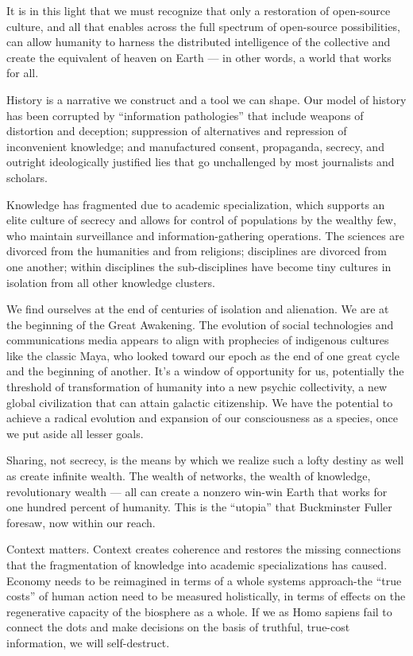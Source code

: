 \documentclass[letterpaper,12pt,english]{sphinxmanual}
\begin{document}
It is in this light that we must recognize that only a restoration of open-source culture, and all that enables across the full spectrum of open-source possibilities, can allow humanity to harness the distributed intelligence of the collective and create the equivalent of heaven on Earth — in other words, a world that works for all.

History is a narrative we construct and a tool we can shape. Our model of history has been corrupted by ``information pathologies'' that include weapons of distortion and deception; suppression of alternatives and repression of inconvenient knowledge; and manufactured consent, propaganda, secrecy, and outright ideologically justified lies that go unchallenged by most journalists and scholars.

Knowledge has fragmented due to academic specialization, which supports an elite culture of secrecy and allows for control of populations by the wealthy few, who maintain surveillance and information-gathering operations. The sciences are divorced from the humanities and from religions; disciplines are divorced from one another; within disciplines the sub-disciplines have become tiny cultures in isolation from all
other knowledge clusters.

We find ourselves at the end of centuries of isolation and alienation. We are at the beginning of the Great Awakening. The evolution of social technologies and communications media appears to align with prophecies of indigenous cultures like the classic Maya, who looked toward our epoch as the end of one great cycle and the beginning of another. It's a window of opportunity for us, potentially the threshold of transformation of humanity into a new psychic collectivity, a new global civilization that can attain galactic citizenship. We have the potential to achieve a radical evolution and expansion of our consciousness as a species, once we put aside all lesser goals.

Sharing, not secrecy, is the means by which we realize such a lofty destiny as well as create infinite wealth. The wealth of networks, the wealth of knowledge, revolutionary wealth — all can create a nonzero win-win Earth that works for one hundred percent of humanity. This is the ``utopia'' that Buckminster Fuller foresaw, now within our reach.

Context matters. Context creates coherence and restores the missing connections that the fragmentation of knowledge into academic specializations has caused. Economy needs to be reimagined in terms of a whole systems approach-the ``true costs'' of human action need to be measured holistically, in terms of effects on the regenerative capacity of the biosphere as a whole. If we as Homo sapiens fail to connect the dots and make decisions on the basis of truthful, true-cost information, we will self-destruct.
\end{document}
